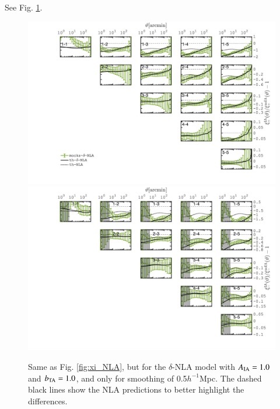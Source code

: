 \documentclass[useAMS,usenatbib]{mn2e}
\begin{document}
See Fig. \ref{fig:xi_deltaNLA}.

\begin{figure}
\includegraphics[width=\columnwidth]{graphs/frac_xip_IA1_skysim_deltaNLA_srd}
\includegraphics[width=\columnwidth]{graphs/frac_xim_IA1_skysim_deltaNLA_srd}
\caption{Same as Fig. \ref{fig:xi_NLA}, but for the $\delta$-NLA model with $A_{\rm IA}=1.0$ and $b_{\rm TA}=1.0$, and only for smoothing of 0.5$h^{-1}$Mpc. The dashed black lines show the NLA predictions to better highlight the differences.  }
\label{fig:xi_deltaNLA}
\end{figure}
\end{document}
